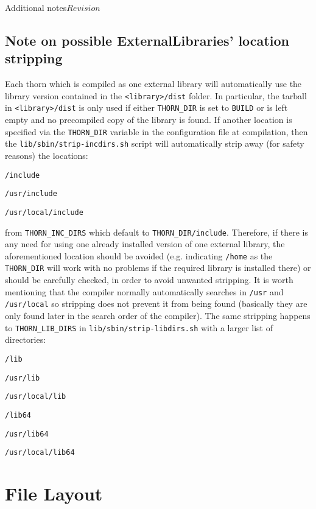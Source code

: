 \begin{cactuspart}{Additional notes}{}{$Revision$}
\subsection{Note on possible ExternalLibraries' location stripping}
\label{sec:stripping}

Each thorn which is compiled as one external library
will automatically use the library version contained in the
\texttt{<library>/dist} folder. In particular, the tarball in
\texttt{<library>/dist} is only used if either \texttt{THORN\_DIR} is
set to \texttt{BUILD} or is left empty and no precompiled copy of the
library is found. If another location is specified via the
\texttt{THORN\_DIR} variable in the configuration file at
compilation, then the \texttt{lib/sbin/strip-incdirs.sh} script will
automatically strip away (for safety reasons) the locations:
\begin{Lentry}
\item [\texttt{/include}]
\item [\texttt{/usr/include}]
\item [\texttt{/usr/local/include}]
\end{Lentry}
from \texttt{THORN\_INC\_DIRS} which default to
\texttt{THORN\_DIR/include}. Therefore, if there is any need for using
one already installed version of one external library, the
aforementioned location should be avoided (e.g. indicating
\texttt{/home} as the \texttt{THORN\_DIR} will work with no problems
if the required library is installed there) or should be carefully
checked, in order to avoid unwanted stripping. It is worth mentioning
that the compiler normally automatically searches in \texttt{/usr} and
\texttt{/usr/local} so stripping does not prevent it from being
found (basically they are only found later in the search order of
the compiler). The same stripping happens to \texttt{THORN\_LIB\_DIRS}
in \texttt{lib/sbin/strip-libdirs.sh} with a larger list of directories:
\begin{Lentry}
\item [\texttt{/lib}]
\item [\texttt{/usr/lib}]
\item [\texttt{/usr/local/lib}]
\item [\texttt{/lib64}]
\item [\texttt{/usr/lib64}]
\item [\texttt{/usr/local/lib64}]
\end{Lentry}

\section{File Layout}
\label{file_layout}


\end{cactuspart}
